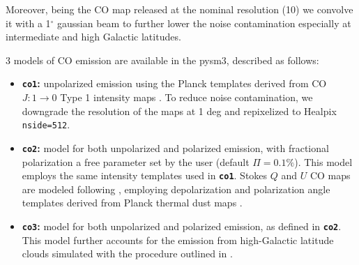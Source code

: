 \documentclass[twocolumn]{aastex631}
\begin{document}
 
Moreover, being the  CO map released at the nominal resolution (10\arcmin) we convolve it with a 1$^\circ$ gaussian beam to further lower the noise contamination  especially at intermediate and high Galactic latitudes.

    3  models  of CO emission are available in the pysm3, described    as follows: 
\begin{itemize}
    \item {\bf\texttt{co1}:} unpolarized emission using  the Planck templates derived from  CO $J:1\rightarrow0$ Type 1 intensity   maps \citep{planck2013-p03a}. To reduce noise contamination, we downgrade the resolution of the maps at 1 deg and repixelized to Healpix \texttt{nside=512}. 
      \item {\bf\texttt{co2}:} model for both unpolarized and polarized emission, with fractional polarization a free parameter set by the user (default $\Pi = 0.1 \%$). This model employs the same intensity templates used in  {\bf\texttt{co1}}.  Stokes $Q$ and $U$ CO maps are modeled following \citet[eqs. (12) and (13) of]{Puglisi:2017}, employing  depolarization  and polarization angle  templates derived from   Planck thermal dust maps \citep{planck2014-a12}. 
        \item {\bf\texttt{co3}:}  model for both unpolarized and polarized emission, as defined in {\bf\texttt{co2}}. This model further accounts for the emission from high-Galactic latitude clouds simulated with the procedure outlined in \citet{Puglisi:2017}.
\end{itemize}
 
\end{document}
